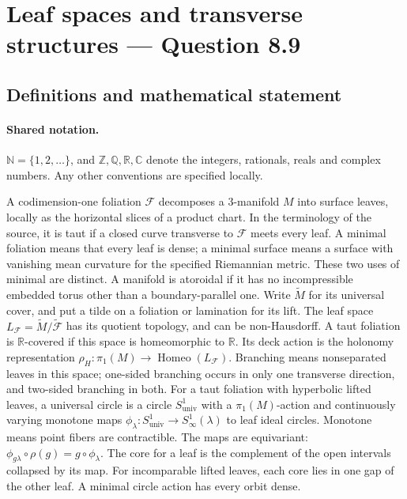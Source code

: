 \documentclass[11pt]{article}
\begin{document}
\section{Leaf spaces and transverse structures — Question 8.9}\label{statement}

\subsection{Definitions and mathematical statement}

\paragraph{Shared notation.}$\mathbb N=\{1,2,\ldots\}$, and $\mathbb Z,\mathbb Q,\mathbb R,\mathbb C$ denote the integers, rationals, reals and complex numbers. Any other conventions are specified locally.


A codimension-one foliation $\mathcal F$ decomposes a $3$-manifold $M$ into surface leaves, locally as the horizontal slices of a product chart. In the terminology of the source, it is taut if a closed curve transverse to $\mathcal F$ meets every leaf. A minimal foliation means that every leaf is dense; a minimal surface means a surface with vanishing mean curvature for the specified Riemannian metric. These two uses of minimal are distinct. A manifold is atoroidal if it has no incompressible embedded torus other than a boundary-parallel one. Write $\widetilde M$ for its universal cover, and put a tilde on a foliation or lamination for its lift. The leaf space $L_{\mathcal F}=\widetilde M/\widetilde{\mathcal F}$ has its quotient topology, and can be non-Hausdorff. A taut foliation is $\mathbb R$-covered if this space is homeomorphic to $\mathbb R$. Its deck action is the holonomy representation $\rho_H:\pi_1(M)\longrightarrow\operatorname{Homeo}(L_{\mathcal F})$. Branching means nonseparated leaves in this space; one-sided branching occurs in only one transverse direction, and two-sided branching in both. For a taut foliation with hyperbolic lifted leaves, a universal circle is a circle $S^1_{\mathrm{univ}}$ with a $\pi_1(M)$-action and continuously varying monotone maps $\phi_\lambda:S^1_{\mathrm{univ}}\to S^1_\infty(\lambda)$ to leaf ideal circles. Monotone means point fibers are contractible. The maps are equivariant: $\phi_{g\lambda}\circ\rho(g)=g\circ\phi_\lambda$. The core for a leaf is the complement of the open intervals collapsed by its map. For incomparable lifted leaves, each core lies in one gap of the other leaf. A minimal circle action has every orbit dense.
\end{document}

